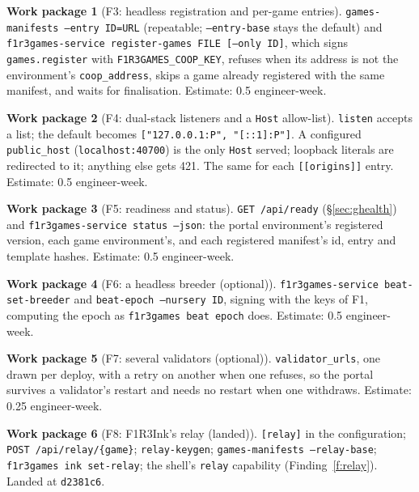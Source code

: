 \documentclass[11pt]{article}
\theoremstyle{definition}
\newtheorem{workpackage}{Work package}
\theoremstyle{remark}
\newcommand{\code}[1]{\texttt{#1}}
\begin{document}
\begin{workpackage}[F3: headless registration and per-game entries]\label{wp:f3}
\code{games-manifests --entry ID=URL} (repeatable; \code{--entry-base} stays the
default) and \code{f1r3games-service register-games FILE [--only ID]}, which signs
\code{games.register} with \code{F1R3GAMES\_COOP\_KEY}, refuses when its address is not
the environment's \code{coop\_address}, skips a game already registered with the same
manifest, and waits for finalisation. Estimate: 0.5 engineer-week.
\end{workpackage}

\begin{workpackage}[F4: dual-stack listeners and a \code{Host} allow-list]\label{wp:f4}
\code{listen} accepts a list; the default becomes
\code{["127.0.0.1:P", "[::1]:P"]}. A configured \code{public\_host}
(\code{localhost:40700}) is the only \code{Host} served; loopback literals are
redirected to it; anything else gets 421. The same for each \code{[[origins]]}
entry. Estimate: 0.5 engineer-week.
\end{workpackage}

\begin{workpackage}[F5: readiness and status]\label{wp:f5}
\code{GET /api/ready} (\S\ref{sec:ghealth}) and \code{f1r3games-service status
--json}: the portal environment's registered version, each game environment's, and
each registered manifest's id, entry and template hashes. Estimate: 0.5
engineer-week.
\end{workpackage}

\begin{workpackage}[F6: a headless breeder (optional)]\label{wp:f6}
\code{f1r3games-service beat-set-breeder} and \code{beat-epoch --nursery ID}, signing
with the keys of F1, computing the epoch as \code{f1r3games beat epoch} does.
Estimate: 0.5 engineer-week.
\end{workpackage}

\begin{workpackage}[F7: several validators (optional)]\label{wp:f7}
\code{validator\_urls}, one drawn per deploy, with a retry on another when one
refuses, so the portal survives a validator's restart and needs no restart when one
withdraws. Estimate: 0.25 engineer-week.
\end{workpackage}

\begin{workpackage}[F8: F1R3Ink's relay (landed)]\label{wp:f8}
\code{[relay]} in the configuration; \code{POST /api/relay/\{game\}};
\code{relay-keygen}; \code{games-manifests --relay-base}; \code{f1r3games ink
set-relay}; the shell's \code{relay} capability (Finding~\ref{f:relay}). Landed at
\code{d2381c6}.
\end{workpackage}
\end{document}
